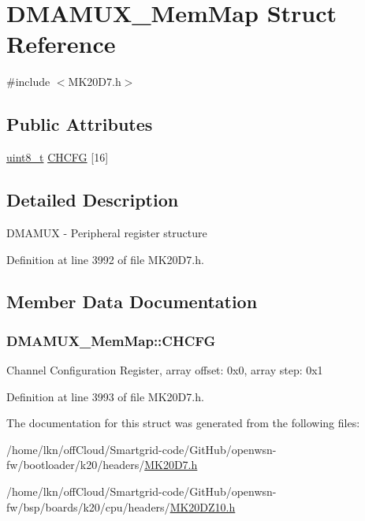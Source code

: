 \hypertarget{struct_d_m_a_m_u_x___mem_map}{}\section{D\+M\+A\+M\+U\+X\+\_\+\+Mem\+Map Struct Reference}
\label{struct_d_m_a_m_u_x___mem_map}


{\ttfamily \#include $<$M\+K20\+D7.\+h$>$}

\subsection*{Public Attributes}
\begin{DoxyCompactItemize}
\item 
\hyperlink{_p_e___types_8h_aba7bc1797add20fe3efdf37ced1182c5}{uint8\+\_\+t} \hyperlink{struct_d_m_a_m_u_x___mem_map_ae4fed888be92df6ffb530c275a218caf}{C\+H\+C\+FG} \mbox{[}16\mbox{]}
\end{DoxyCompactItemize}


\subsection{Detailed Description}
D\+M\+A\+M\+UX -\/ Peripheral register structure 

Definition at line 3992 of file M\+K20\+D7.\+h.



\subsection{Member Data Documentation}
\subsubsection[{\texorpdfstring{C\+H\+C\+FG}{CHCFG}}]{ D\+M\+A\+M\+U\+X\+\_\+\+Mem\+Map\+::\+C\+H\+C\+FG}\hypertarget{struct_d_m_a_m_u_x___mem_map_ae4fed888be92df6ffb530c275a218caf}{}\label{struct_d_m_a_m_u_x___mem_map_ae4fed888be92df6ffb530c275a218caf}
Channel Configuration Register, array offset\+: 0x0, array step\+: 0x1 

Definition at line 3993 of file M\+K20\+D7.\+h.



The documentation for this struct was generated from the following files\+:\begin{DoxyCompactItemize}
\item 
/home/lkn/off\+Cloud/\+Smartgrid-\/code/\+Git\+Hub/openwsn-\/fw/bootloader/k20/headers/\hyperlink{bootloader_2k20_2headers_2_m_k20_d7_8h}{M\+K20\+D7.\+h}\item 
/home/lkn/off\+Cloud/\+Smartgrid-\/code/\+Git\+Hub/openwsn-\/fw/bsp/boards/k20/cpu/headers/\hyperlink{_m_k20_d_z10_8h}{M\+K20\+D\+Z10.\+h}\end{DoxyCompactItemize}
